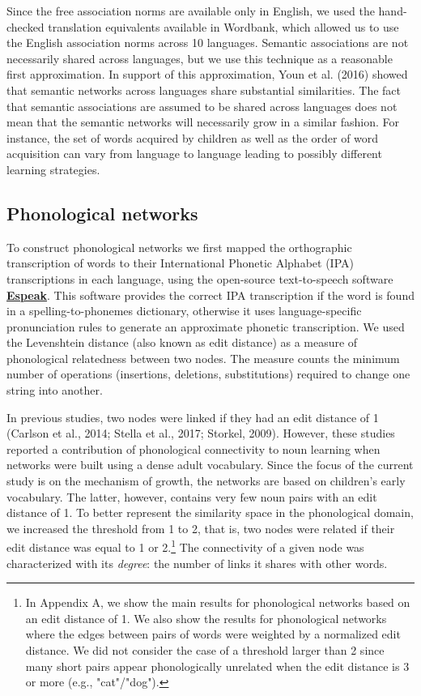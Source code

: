 \documentclass[english,,man,floatsintext]{apa6}
\let\rmarkdownfootnote\footnote%
\def\footnote{\protect\rmarkdownfootnote}
\begin{document}
Since the free association norms are available only in English, we used the hand-checked translation equivalents available in Wordbank, which allowed us to use the English association norms across 10 languages. Semantic associations are not necessarily shared across languages, but we use this technique as a reasonable first approximation. In support of this approximation, Youn et al. (2016) showed that semantic networks across languages share substantial similarities. The fact that semantic associations are assumed to be shared across languages does not mean that the semantic networks will necessarily grow in a similar fashion. For instance, the set of words acquired by children as well as the order of word acquisition can vary from language to language leading to possibly different learning strategies.

\hypertarget{phonological-networks}{%
\subsection{Phonological networks}\label{phonological-networks}}

To construct phonological networks we first mapped the orthographic transcription of words to their International Phonetic Alphabet (IPA) transcriptions in each language, using the open-source text-to-speech software \textbf{\href{http://http://espeak.sourceforge.net/}{Espeak}}. This software provides the correct IPA transcription if the word is found in a spelling-to-phonemes dictionary, otherwise it uses language-specific pronunciation rules to generate an approximate phonetic transcription. We used the Levenshtein distance (also known as edit distance) as a measure of phonological relatedness between two nodes. The measure counts the minimum number of operations (insertions, deletions, substitutions) required to change one string into another.

In previous studies, two nodes were linked if they had an edit distance of 1 (Carlson et al., 2014; Stella et al., 2017; Storkel, 2009). However, these studies reported a contribution of phonological connectivity to noun learning when networks were built using a dense adult vocabulary. Since the focus of the current study is on the mechanism of growth, the networks are based on children's early vocabulary. The latter, however, contains very few noun pairs with an edit distance of 1. To better represent the similarity space in the phonological domain, we increased the threshold from 1 to 2, that is, two nodes were related if their edit distance was equal to 1 or 2.\footnote{In Appendix A, we show the main results for phonological networks based on an edit distance of 1. We also show the results for phonological networks where the edges between pairs of words were weighted by a normalized edit distance. We did not consider the case of a threshold larger than 2 since many short pairs appear phonologically unrelated when the edit distance is 3 or more (e.g., "cat"/"dog").} The connectivity of a given node was characterized with its \emph{degree}: the number of links it shares with other words.
\end{document}
